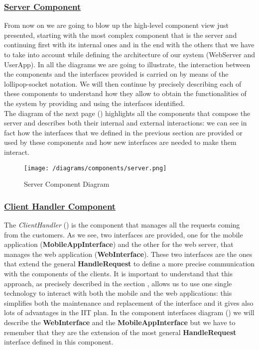 		\subsubsection[Server Component]{\hyperlink{toc}{Server Component}}
			\label{sec:serverComponent}
			
			From now on we are going to blow up the high-level component view just presented, starting with the most complex component that is the server and continuing first with its internal ones and in the end with the others that we have to take into account while defining the architecture of our system (WebServer and UserApp). In all the diagrams we are going to illustrate, the interaction between the components and the interfaces provided is carried on by means of the lollipop-socket notation. We will then continue by precisely describing each of these components to understand how they allow to obtain the functionalities of the system by providing and using the interfaces identified.\\
			
			The diagram of the next page () highlights all the components that compose the server and describes both their internal and external interactions: we can see in fact how the interfaces that we defined in the previous section are provided or used by these components and how new interfaces are needed to make them interact.
			
			\begin{figure}[h!]
				\centering
				\texttt{[image: /diagrams/components/server.png]}
				\caption{\label{fig:serverComp} Server Component Diagram}
			\end{figure}
		
			\FloatBarrier 
		
		\subsubsection[Client Handler Component]{\hyperlink{toc}{Client Handler Component}}
			\label{sec:clientHandlerComponent}
			
			The \emph{ClientHandler} () is the component that manages all the requests coming from the customers. As we see, two interfaces are provided, one for the mobile application (\textbf{MobileAppInterface}) and the other for the web server, that manages the web application (\textbf{WebInterface}). These two interfaces are the ones that extend the general \textbf{HandleRequest} to define a more precise communication with the components of the clients. It is important to understand that this approach, as precisely described in the section , allows us to use one single technology to interact with both the mobile and the web applications: this simplifies both the maintenance and replacement of the interface and it gives also lots of advantages in the IIT plan. In the component interfaces diagram () we will describe the \textbf{WebInterface} and the \textbf{MobileAppInterface} but we have to remember that they are the extension of the most general \textbf{HandleRequest} interface defined in this component.
			
